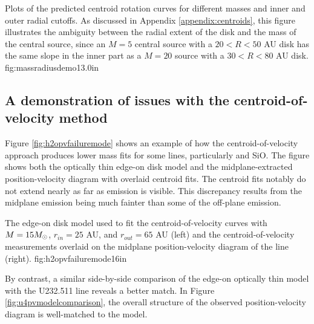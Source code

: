 \documentclass[twocolumn]{aastex62}
\begin{document}
{Plots of the predicted centroid rotation curves for different masses
and inner and outer radial cutoffs.  As discussed in Appendix \ref{appendix:centroids},
this figure illustrates the ambiguity between the radial extent of the disk and
the mass of the central source, since an $M=5$ \msun central source with a
$20<R<50$ AU disk has the same slope in the inner part as a $M=20$ \msun source
with a $30<R<80$ AU disk.
}
{fig:massradiusdemo}{1}{3.0in}


\subsection{A demonstration of issues with the centroid-of-velocity method}
Figure \ref{fig:h2opvfailuremode} shows an example of how the
centroid-of-velocity approach produces lower mass fits for some lines,
particularly \water and SiO.  The figure shows both the optically thin edge-on
disk model and the midplane-extracted position-velocity diagram with overlaid
centroid fits.  The centroid fits notably do not extend nearly as far as
emission is visible.  This discrepancy results from the midplane emission being
much fainter than some of the off-plane emission.

{The edge-on disk model used to fit the centroid-of-velocity curves with
$M=15 M_{\odot}$, $r_{in}=25$ AU, and $r_{out}=65$ AU (left) and the centroid-of-velocity measurements
overlaid on the midplane position-velocity diagram of the \water line (right).}
{fig:h2opvfailuremode}{1}{6in}

By contrast, a similar side-by-side comparison of the edge-on optically thin
model with the U232.511 line reveals a better match.  In Figure
\ref{fig:u4pvmodelcomparison}, the overall structure of the observed
position-velocity diagram is well-matched to the model.

\end{document}
